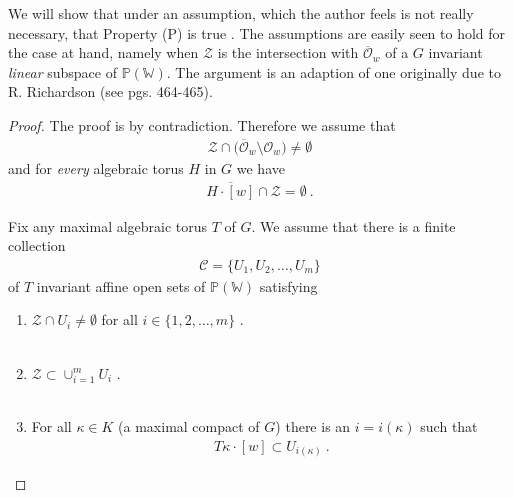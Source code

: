\documentclass[12pt]{amsart}
\numberwithin{equation}{section}
\numberwithin{remark}{section}
\numberwithin{theorem}{section}
\numberwithin{proposition}{section}
\numberwithin{definition}{section}
\numberwithin{lemma}{section}
\numberwithin{claim}{section}
\numberwithin{corollary}{section}
\numberwithin{conjecture}{section}
\begin{document}
We will show that under an assumption, which the author feels is not really necessary,  that Property (P) is true . The assumptions are easily seen to hold for the case at hand, namely when $\mathscr{Z}$ is the intersection  with $\overline{\mathcal{O}}_w$ of a $G$ invariant \emph{linear} subspace of $\mathbb{P}(\mathbb{W})$.  The argument is an adaption of one originally due to R. Richardson (see \cite{birkes71} pgs. 464-465). 
\begin{proof} The proof is by contradiction. Therefore we assume that  
\begin{align}
\mathscr{Z}\cap \big(\overline{\mathcal{O}}_w\setminus {\mathcal{O}}_w\big) \neq \emptyset
\end{align}
and for \emph{every} algebraic torus $H$ in $G$ we have 
\begin{align}
\overline{H\cdot[w]}\cap \mathscr{Z}=\emptyset \ .
\end{align}

Fix any maximal algebraic torus $T$ of $G$. We assume that there is a finite collection 
\begin{align}
\mathscr{C}=\{ U_1 , U_2, \dots , U_m\}
\end{align}
of $T$ invariant affine open sets of  $\mathbb{P}(\mathbb{W})$ satisfying
\begin{enumerate}
 \item $\mathscr{Z}\cap U_i\neq \emptyset$ for all $i\in\{1,2,\dots,m\} $ .\\
 \ \\
 \item $\mathscr{Z}\subset \cup_{i=1}^mU_i $ . \\
 \ \\
 \item For all $\kappa\in K$ (a maximal compact of $G$) there is an $i=i(\kappa)$ such that\\
 \begin{align}
 T\kappa\cdot [w]\subset U_{i(\kappa)} \ .
 \end{align}
 \end{enumerate}
 

\end{proof}
\end{document}
